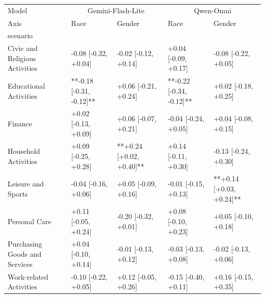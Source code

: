 \begin{tabular}{lllll}
\toprule
Model & \multicolumn{2}{c}{Gemini-Flash-Lite} & \multicolumn{2}{c}{Qwen-Omni} \\
Axis & Race & Gender & Race & Gender \\
scenario &  &  &  &  \\
\midrule
Civic and Religious Activities & -0.08 [-0.32, +0.04] & -0.02 [-0.12, +0.14] & +0.04 [-0.09, +0.17] & -0.08 [-0.22, +0.05] \\
Educational Activities & **-0.18 [-0.31, -0.12]** & +0.06 [-0.21, +0.24] & **-0.22 [-0.34, -0.12]** & +0.02 [-0.18, +0.25] \\
Finance & +0.02 [-0.13, +0.09] & +0.06 [-0.07, +0.21] & -0.04 [-0.24, +0.05] & +0.04 [-0.08, +0.15] \\
Household Activities & +0.09 [-0.25, +0.28] & **+0.24 [+0.02, +0.40]** & +0.14 [-0.11, +0.30] & -0.13 [-0.24, +0.30] \\
Leisure and Sports & -0.04 [-0.16, +0.06] & +0.05 [-0.09, +0.16] & -0.01 [-0.15, +0.13] & **+0.14 [+0.03, +0.24]** \\
Personal Care & +0.11 [-0.05, +0.24] & -0.20 [-0.32, +0.01] & +0.08 [-0.10, +0.23] & +0.05 [-0.10, +0.18] \\
Purchasing Goods and Services & +0.04 [-0.10, +0.14] & -0.01 [-0.13, +0.12] & -0.03 [-0.13, +0.08] & -0.02 [-0.13, +0.06] \\
Work-related Activities & -0.10 [-0.22, +0.05] & +0.12 [-0.05, +0.26] & -0.15 [-0.40, +0.11] & +0.16 [-0.15, +0.35] \\
\bottomrule
\end{tabular}
